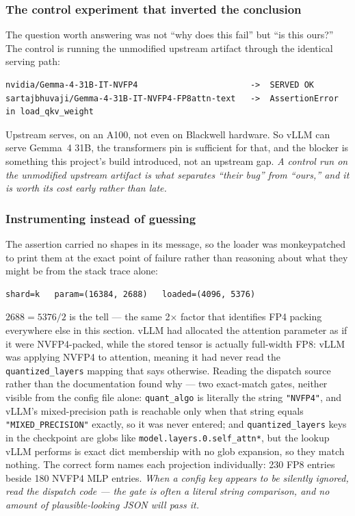 \documentclass[11pt]{article}
\begin{document}
\subsubsection*{The control experiment that inverted the conclusion}
The question worth answering was not ``why does this fail'' but ``is this ours?'' The
control is running the unmodified upstream artifact through the identical serving path:

\begin{lstlisting}
nvidia/Gemma-4-31B-IT-NVFP4                       ->  SERVED OK
sartajbhuvaji/Gemma-4-31B-IT-NVFP4-FP8attn-text   ->  AssertionError in load_qkv_weight
\end{lstlisting}

Upstream serves, on an A100, not even on Blackwell hardware. So vLLM can serve Gemma~4
31B, the transformers pin is sufficient for that, and the blocker is something this
project's build introduced, not an upstream gap. \emph{A control run on the unmodified
upstream artifact is what separates ``their bug'' from ``ours,'' and it is worth its
cost early rather than late.}

\subsubsection*{Instrumenting instead of guessing}
The assertion carried no shapes in its message, so the loader was monkeypatched to
print them at the exact point of failure rather than reasoning about what they might be
from the stack trace alone:

\begin{lstlisting}
shard=k   param=(16384, 2688)   loaded=(4096, 5376)
\end{lstlisting}

$2688 = 5376/2$ is the tell --- the same 2$\times$ factor that identifies FP4 packing
everywhere else in this section. vLLM had allocated the attention parameter as if it
were NVFP4-packed, while the stored tensor is actually full-width FP8: vLLM was applying
NVFP4 to attention, meaning it had never read the \texttt{quantized\_layers} mapping
that says otherwise. Reading the dispatch source rather than the documentation found
why --- two exact-match gates, neither visible from the config file alone:
\texttt{quant\_algo} is literally the string \texttt{"NVFP4"}, and vLLM's mixed-precision
path is reachable only when that string equals \texttt{"MIXED\_PRECISION"} exactly, so it
was never entered; and \texttt{quantized\_layers} keys in the checkpoint are globs like
\texttt{model.layers.0.self\_attn*}, but the lookup vLLM performs is exact dict
membership with no glob expansion, so they match nothing. The correct form names each
projection individually: 230 FP8 entries beside 180 NVFP4 MLP entries. \emph{When a
config key appears to be silently ignored, read the dispatch code --- the gate is often a
literal string comparison, and no amount of plausible-looking JSON will pass it.}
\end{document}
